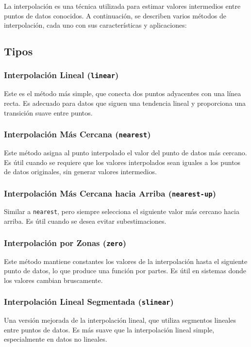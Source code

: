 
La interpolación es una técnica utilizada para estimar valores intermedios 
entre puntos de datos conocidos. A continuación, se describen varios métodos 
de interpolación, cada uno con sus características y aplicaciones:
\subsection{Tipos}
\subsubsection{Interpolación Lineal (\texttt{linear})}
Este es el método más simple, que conecta dos puntos adyacentes con una 
línea recta. Es adecuado para datos que siguen una tendencia lineal y 
proporciona una transición suave entre puntos.

\subsubsection{Interpolación Más Cercana (\texttt{nearest})}
Este método asigna al punto interpolado el valor del punto de datos más
 cercano. Es útil cuando se requiere que los valores interpolados sean 
 iguales a los puntos de datos originales, sin generar valores intermedios.

\subsubsection{Interpolación Más Cercana hacia Arriba (\texttt{nearest-up})}
Similar a \texttt{nearest}, pero siempre selecciona el siguiente valor más 
cercano hacia arriba. Es útil cuando se desea evitar subestimaciones.

\subsubsection{Interpolación por Zonas (\texttt{zero})}
Este método mantiene constantes los valores de la interpolación hasta el 
siguiente punto de datos, lo que produce una función por partes. Es útil 
en sistemas donde los valores cambian bruscamente.

\subsubsection{Interpolación Lineal Segmentada (\texttt{slinear})}
Una versión mejorada de la interpolación lineal, que utiliza segmentos 
lineales entre puntos de datos. Es más suave que la interpolación lineal 
simple, especialmente en datos no lineales.

